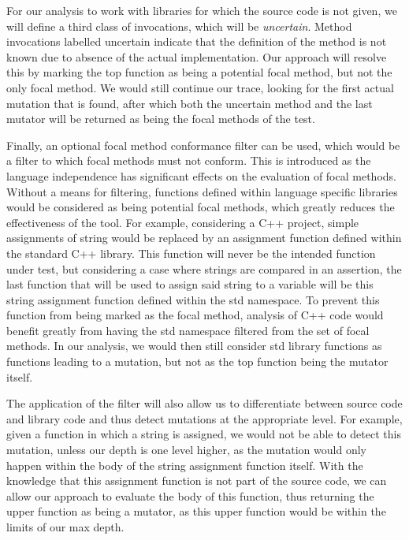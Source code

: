 \documentclass[11pt]{article}
\begin{document}
\begin{multicols}{2}
For our analysis to work with libraries for which the source code is not given, we will define a third class of invocations, which will be \textit{uncertain}. Method invocations labelled uncertain indicate that the definition of the method is not known due to absence of the actual implementation. Our approach will resolve this by marking the top function as being a potential focal method, but not the only focal method. We would still continue our trace, looking for the first actual mutation that is found, after which both the uncertain method and the last mutator will be returned as being the focal methods of the test.

Finally, an optional focal method conformance filter can be used, which would be a filter to which focal methods must not conform. This is introduced as the language independence has significant effects on the evaluation of focal methods. Without a means for filtering, functions defined within language specific libraries would be considered as being potential focal methods, which greatly reduces the effectiveness of the tool. For example, considering a C++ project, simple assignments of string would be replaced by an assignment function defined within the standard C++ library. This function will never be the intended function under test, but considering a case where strings are compared in an assertion, the last function that will be used to assign said string to a variable will be this string assignment function defined within the std namespace. To prevent this function from being marked as the focal method, analysis of C++ code would benefit greatly from having the std namespace filtered from the set of focal methods. In our analysis, we would then still consider std library functions as functions leading to a mutation, but not as the top function being the mutator itself.

The application of the filter will also allow us to differentiate between source code and library code and thus detect mutations at the appropriate level. For example, given a function in which a string is assigned, we would not be able to detect this mutation, unless our depth is one level higher, as the mutation would only happen within the body of the string assignment function itself. With the knowledge that this assignment function is not part of the source code, we can allow our approach to evaluate the body of this function, thus returning the upper function as being a mutator, as this upper function would be within the limits of our max depth.


\end{multicols}
\end{document}
